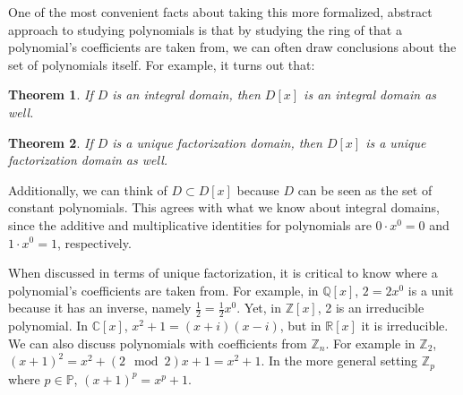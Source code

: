 \documentclass[11pt]{amsart}
\newtheorem{theorem}{Theorem}[section]
\theoremstyle{definition}
\newcommand{\complexNumbers}{\mathbb{C}}
\newcommand{\reals}{\mathbb{R}}
\newcommand{\rationals}{\mathbb{Q}}
\newcommand{\integers}{\mathbb{Z}}
\newcommand{\primes}{\mathbb{P}}
\begin{document}
One of the most convenient facts about taking this more formalized, abstract approach to studying polynomials is that by studying the ring of
that a polynomial's coefficients are taken from, we can often draw conclusions about the set of polynomials itself. For example, it turns out that:
\begin{theorem}
	If $D$ is an integral domain, then $D[x]$ is an integral domain as well.
\end{theorem}
\begin{theorem}
	If $D$ is a unique factorization domain, then $D[x]$ is a unique factorization domain as well.
\end{theorem}
Additionally, we can think of $D \subset D[x]$ because $D$ can be seen as the set of constant polynomials. This agrees with what we know
about integral domains, since the additive and multiplicative identities for polynomials are $0 \cdot x^0 = 0$ and $1 \cdot x^0 = 1$, respectively.

When discussed in terms of unique factorization, it is critical to know where a polynomial's coefficients are taken from. For example, in
$\rationals[x]$, $2 = 2x^0$ is a unit because it has an inverse, namely $\frac{1}{2} = \frac{1}{2}x^0$. Yet, in $\integers[x]$, 2 is an irreducible
polynomial. In $\complexNumbers[x]$, $x^2 + 1 = (x + i)(x - i)$, but in $\reals[x]$ it is irreducible. We can also discuss polynomials with
coefficients from $\integers_n$. For example in $\integers_2$, $(x+1)^2 = x^2 + (2 \mod 2)x + 1 = x^2 + 1$. In the more general setting
$\integers_p$ where $p \in \primes$, $(x + 1)^p = x^p + 1$.
\end{document}
